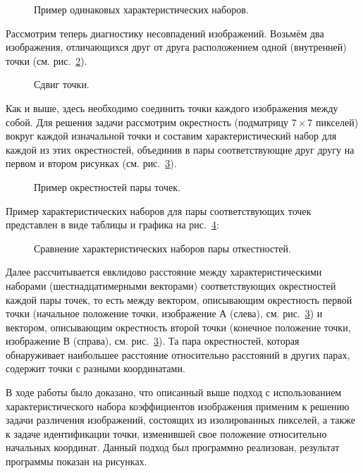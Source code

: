 \documentclass{csmathnotes}
\begin{document}
\begin{figure}[h!]
	\caption{Пример одинаковых характеристических наборов.}
	\label{ris4}
\end{figure}

Рассмотрим теперь диагностику несовпадений изображений. Возьмём два изображения, отличающихся друг от друга расположением одной (внутренней) точки (см. рис.~\ref{ris5}).

\begin{figure}[h!]
	\caption{Сдвиг точки.}
	\label{ris5}
\end{figure}

Как и выше, здесь необходимо соединить точки каждого изображения между собой. Для решения задачи рассмотрим окрестность (подматрицу $7\times7$ пикселей) вокруг каждой изначальной точки и составим характеристический набор для каждой из этих окрестностей, объединив в пары соответствующие друг другу на первом и втором рисунках  (см. рис.~\ref{ris6}).  

\begin{figure}[h!]
	\caption{Пример окрестностей пары точек.}
	\label{ris6}
\end{figure}

Пример характеристических наборов для пары соответствующих точек представлен в виде таблицы и графика на рис.~\ref{ris7}:

\begin{figure}[h!]
	\caption{Сравнение характеристических наборов пары откестностей.}
	\label{ris7}
\end{figure}

Далее рассчитывается евклидово расстояние между характеристическими наборами (шестнадцатимерными векторами) соответствующих окрестностей каждой пары точек, то есть между вектором, описывающим окрестность первой точки (начальное положение  точки, изображение А (слева), см. рис.~\ref{ris6}) и вектором, описывающим окрестность второй точки (конечное положение  точки, изображение В (справа), см. рис.~\ref{ris6}). Та пара окрестностей, которая обнаруживает наибольшее расстояние относительно расстояний в других парах, содержит точки с разными координатами.

В ходе работы было доказано, что описанный выше подход с использованием характеристического набора коэффициентов изображения применим к решению задачи различения изображений, состоящих из изолированных пикселей, а также к задаче идентификации точки, изменившей свое положение относительно начальных координат. Данный подход был программно реализован, результат программы показан на рисунках.

\printbibliography
\end{document}
